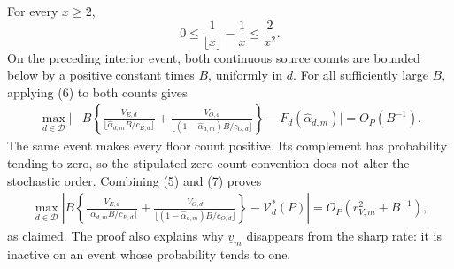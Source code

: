 For every \(x\ge2\),
\[
 0\le\frac1{\lfloor x\rfloor}-\frac1x
 \le\frac2{x^2}.
 \tag{6}
\]
On the preceding interior event, both continuous source counts are bounded below by a positive constant times \(B\), uniformly in \(d\).  For all sufficiently large \(B\), applying (6) to both counts gives
\[
\begin{aligned}
 \max_{d\in\mathcal D}\Bigg|&B\left\{
 \frac{V_{E,d}}{\lfloor\widehat\alpha_{d,m}B/c_{E,d}\rfloor}
 +\frac{V_{O,d}}{\lfloor(1-\widehat\alpha_{d,m})B/c_{O,d}\rfloor}
 \right\}
 -F_d(\widehat\alpha_{d,m})\Bigg|
 =O_P(B^{-1}).
\end{aligned}
 \tag{7}
\]
The same event makes every floor count positive.  Its complement has probability tending to zero, so the stipulated zero-count convention does not alter the stochastic order.  Combining (5) and (7) proves
\[
\begin{aligned}
 \max_{d\in\mathcal D}\left|B\left\{
 \frac{V_{E,d}}{\lfloor\widehat\alpha_{d,m}B/c_{E,d}\rfloor}
 +\frac{V_{O,d}}{\lfloor(1-\widehat\alpha_{d,m})B/c_{O,d}\rfloor}
 \right\}-\mathcal V_d^*(P)\right|
 =O_P(r_{V,m}^2+B^{-1}),
\end{aligned}
\]
as claimed.  The proof also explains why \(\underline v_m\) disappears from the sharp rate: it is inactive on an event whose probability tends to one.